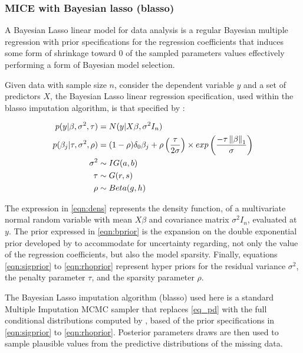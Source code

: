 \subsubsection{MICE with Bayesian lasso (blasso)}
	A Bayesian Lasso linear model for data analysis is a regular Bayesian multiple regression with prior 
	specifications for the regression coefficients that induces some form of shrinkage toward 0 of the sampled 
	parameters values \citep{parkCasella:2008, hans:2009} effectively performing a form of Bayesian model 
	selection.

	Given data with sample size $n$, consider the dependent variable $y$ and a set of predictors $X$, the Bayesian Lasso 
	linear regression specification, used within the blasso imputation algorithm, is that specified by \cite{hans:2010}:

	\begin{align}
		p(y|\beta, \sigma^2, \tau) &= N(y|X\beta, \sigma^2I_n) \label{eqn:dens} \\
		p(\beta_j|\tau, \sigma^2, \rho) &= 
			(1 - \rho) \delta_0 \beta_j +
			\rho \left( \frac{\tau}{2\sigma} \right) \times
			exp \left( \frac{-\tau \left\lVert\beta\right\rVert_1}{\sigma} \right) \label{eqn:bprior} \\
		\sigma^2 &\sim IG(a, b) \label{eqn:sigprior} \\
		\tau &\sim G(r, s) \label{eqn:tauprior} \\
		\rho &\sim Beta(g, h) \label{eqn:rhoprior}
	\end{align}
	
	The expression in \eqref{eqn:dens} represents the density function, of a multivariate normal 
	random variable with mean $X\beta$ and covariance matrix $\sigma^2I_n$, evaluated at $y$.
	The prior expressed in \eqref{eqn:bprior} is the expansion on the \cite{parkCasella:2008} double exponential prior
	developed by \cite{hans:2010} to accommodate for uncertainty regarding, not only the value of the regression
	coefficients, but also the model sparsity.
	Finally, equations \eqref{eqn:sigprior} to \eqref{eqn:rhoprior} represent hyper priors for the residual variance $\sigma^2$,
	the penalty parameter $\tau$, and the sparsity parameter $\rho$.

	The Bayesian Lasso imputation algorithm (blasso) used here is a standard Multiple Imputation MCMC sampler 
	that replaces \eqref{eq_pd} with the full conditional distributions computed by \citet{hans:2010}, 
	based of the prior specifications in \eqref{eqn:sigprior} to \eqref{eqn:rhoprior}.
	Posterior parameters draws are then used to sample plausible values from the predictive distributions of 
	the missing data.

